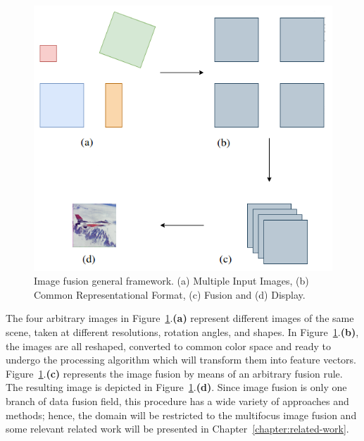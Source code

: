 \begin{figure}[H]
	\centering
	\caption{\label{fig:fusion_general_framework}Image fusion general framework. (a) Multiple Input Images, (b) Common Representational Format, (c) Fusion and (d) Display.}
	\begin{center}
    \includegraphics[scale=0.4]{images/image_fusion_scheme.png}
	\end{center}
	\centering
    \fautor
\end{figure}

The four arbitrary images in Figure~\ref{fig:fusion_general_framework}.\textbf{(a)} represent different images of the same scene, taken at different resolutions, rotation angles, and shapes. In Figure~\ref{fig:fusion_general_framework}.\textbf{(b)}, the images are all reshaped, converted to common color space and ready to undergo the processing algorithm which will transform them into feature vectors. Figure~\ref{fig:fusion_general_framework}.\textbf{(c)} represents the image fusion by means of an arbitrary fusion rule. The resulting image is depicted in Figure~\ref{fig:fusion_general_framework}.\textbf{(d)}. Since image fusion is only one branch of data fusion field, this procedure has a wide variety of approaches and methods; hence, the domain will be restricted to the multifocus image fusion and some relevant related work will be presented in Chapter~\ref{chapter:related-work}.